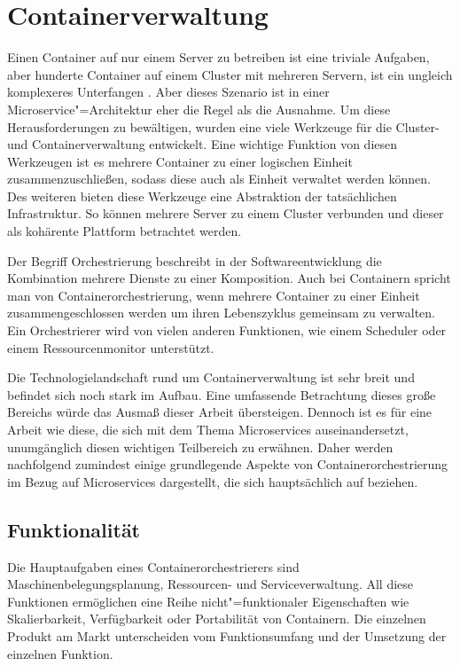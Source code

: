 \section{Containerverwaltung}

Einen Container auf nur einem Server zu betreiben ist eine triviale Aufgaben, aber hunderte Container auf einem Cluster mit mehreren Servern, ist ein ungleich komplexeres Unterfangen \cite{RussinovicContainers}. Aber dieses Szenario ist in einer Microservice"=Architektur eher die Regel als die Ausnahme. Um diese Herausforderungen zu bewältigen, wurden eine viele Werkzeuge für die Cluster- und Containerverwaltung entwickelt. Eine wichtige Funktion von diesen Werkzeugen ist es mehrere Container zu einer logischen Einheit zusammenzuschließen, sodass diese auch als Einheit verwaltet werden können. Des weiteren bieten diese Werkzeuge eine Abstraktion der tatsächlichen Infrastruktur. So können mehrere Server zu einem Cluster verbunden und dieser als kohärente Plattform betrachtet werden. 

Der Begriff Orchestrierung beschreibt in der Softwareentwicklung die Kombination mehrere Dienste zu einer Komposition. Auch bei Containern spricht man von Containerorchestrierung, wenn mehrere Container zu einer Einheit zusammengeschlossen werden um ihren Lebenszyklus gemeinsam zu verwalten. Ein Orchestrierer wird von vielen anderen Funktionen, wie \zB einem Scheduler oder einem Ressourcenmonitor unterstützt. 

Die Technologielandschaft rund um Containerverwaltung ist sehr breit und befindet sich noch stark im Aufbau. Eine umfassende Betrachtung dieses große Bereichs würde das Ausmaß dieser Arbeit übersteigen. Dennoch ist es für eine Arbeit wie diese, die sich mit dem Thema Microservices auseinandersetzt, unumgänglich diesen wichtigen Teilbereich zu erwähnen. Daher werden nachfolgend zumindest einige grundlegende Aspekte von Containerorchestrierung im Bezug auf Microservices dargestellt, die sich hauptsächlich auf \cite{ContainerOrcaWars} beziehen. 

\subsection{Funktionalität}

Die Hauptaufgaben eines Containerorchestrierers sind Maschinenbelegungsplanung, Ressourcen- und Serviceverwaltung. All diese Funktionen ermöglichen eine Reihe nicht"=funktionaler Eigenschaften wie Skalierbarkeit, Verfügbarkeit oder Portabilität von Containern. Die einzelnen Produkt am Markt unterscheiden vom Funktionsumfang und der Umsetzung der einzelnen Funktion.

